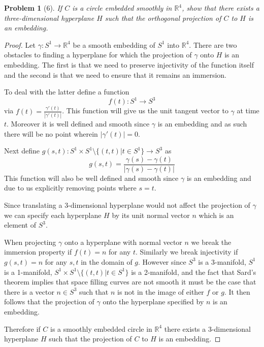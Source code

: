 \documentclass[10pt]{article}
\newcommand{\sk}{\vskip 10mm}
\newcommand{\bb}[1]{\mathbb{#1}}
\theoremstyle{plain}
\newtheorem{problem}{Problem}
\theoremstyle{remark}
\begin{document}
\sk

\begin{problem}[6]
  If $C$ is a circle embedded smoothly in $\bb{R}^4$, show that
  there exists a three-dimensional hyperplane $H$ such that the
  orthogonal projection of $C$ to $H$ is an embedding.
\end{problem}

\begin{proof}
  Let $\gamma:S^1\rightarrow\bb{R}^4$ be a smooth embedding of $S^1$ into $\bb{R}^4$.
  There are two obstacles to finding a hyperplane for which the
  projection of $\gamma$ onto $H$ is an embedding. The first is that
  we need to preserve injectivity of the function itself and the
  second is that we need to ensure that it remains an immersion.

  To deal with the latter define a function
  \[
    f(t):S^1\rightarrow S^3
  \]
  via $f(t)=\frac{\gamma'(t)}{|\gamma'(t)|}$. This function will give us the
  unit tangent vector to $\gamma$ at time $t$. Moreover it is well defined
  and smooth since $\gamma$ is an embedding and as such there will be
  no point wherein $|\gamma'(t)|=0$.

  Next define $g(s,t):S^1\times S^1\setminus\{(t,t)|t\in S^1\}\rightarrow S^3$ as
  \[
    g(s,t) = \frac{\gamma(s)-\gamma(t)}{|\gamma(s)-\gamma(t)|}
  \]
  This function will also be well defined and smooth since $\gamma$ is an embedding
  and due to us explicitly removing points where $s=t$.

  Since translating a 3-dimensional hyperplane would not affect the projection
  of $\gamma$ we can specify each hyperplane $H$ by its unit normal vector $n$ which is
  an element of $S^3$.

  When projecting $\gamma$ onto a hyperplane with normal vector $n$ we break
  the immersion property if $f(t)=n$ for any $t$. Similarly we break
  injectivity if $g(s,t)=n$ for any $s,t$ in the domain of $g$. However
  since $S^3$ is a 3-manifold, $S^1$ is a 1-manifold, $S^1\times S^1\setminus\{(t,t)|t\in S^1\}$
  is a 2-manifold, and the fact that Sard's theorem implies that
  space filling curves are not smooth it must be the case that
  there is a vector $n\in S^3$ such that $n$ is not in the image of either $f$
  or $g$. It then follows that the projection of $\gamma$ onto the hyperplane
  specified by $n$ is an embedding.

  Therefore if $C$ is a smoothly embedded circle in $\bb{R}^4$ there
  exists a 3-dimensional hyperplane $H$ such that the projection of $C$
  to $H$ is an embedding.
\end{proof}

\sk

\end{document}
